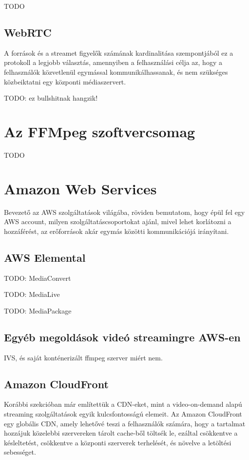 TODO

\subsection{WebRTC}

A források és a streamet figyelők számának kardinalitása szempontjából ez a protokoll a legjobb választás, amennyiben a felhasználási célja az, hogy a felhasználók közvetlenül egymással kommunikálhassanak, és nem szükséges közbeiktatni egy központi médiaszervert. 

TODO: ez bullshitnak hangzik!

\section{Az FFMpeg szoftvercsomag}

TODO

\section{Amazon Web Services}

Bevezető az AWS szolgáltatások világába, röviden bemutatom, hogy épül fel egy AWS account, milyen szolgáltatáscsoportokat ajánl, mivel lehet korlátozni a hozzáférést, az erőforrások akár egymás közötti kommunikációjá irányítani.

\subsection{AWS Elemental}

TODO: MediaConvert

TODO: MediaLive

TODO: MediaPackage

\subsection{Egyéb megoldások videó streamingre AWS-en}

IVS, és saját konténerizált ffmpeg szerver miért nem.

\subsection{Amazon CloudFront}

Korábbi szekcióban már említettük a CDN-eket, mint a video-on-demand alapú streaming szolgáltatások egyik kulcsfontosságú elemeit. Az Amazon CloudFront egy globális CDN, amely lehetővé teszi a felhasználók számára, hogy a tartalmat hozzájuk közelebbi szervereken tárolt cache-ből töltsék le, ezáltal csökkentve a késleltetést, csökkentve a központi szerverek terhelését, és növelve a letöltési sebességet.

